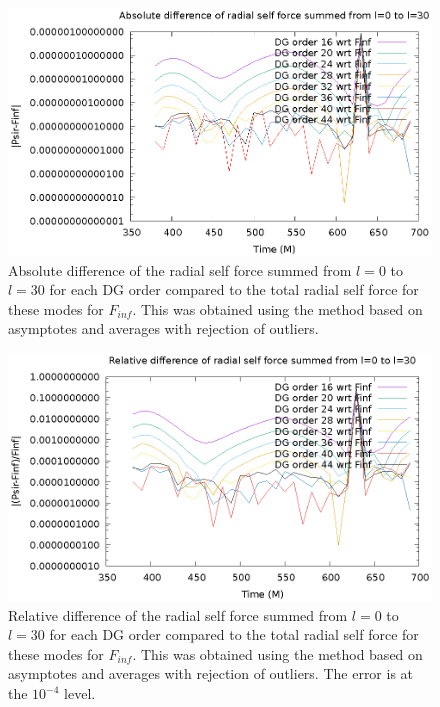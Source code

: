 \begin{figure}
\includegraphics{absdiffpsirvtwfinfdgorders}
\caption{Absolute difference of the radial self force summed from $l=0$ to $l=30$  for each DG order compared to the total radial self force for these modes for $F_{inf}$. This was obtained using the method based on asymptotes and averages with rejection of outliers.}
\label{absmixed}
\end{figure}

\begin{figure}
\includegraphics{reldiffpsirvtwfinfdgorders}
\caption{Relative difference of the radial self force summed from $l=0$ to $l=30$  for each DG order compared to the total radial self force for these modes for $F_{inf}$. This was obtained using the method based on asymptotes and averages with rejection of outliers. The error is at the $10^{-4}$ level.}
\label{relmixed}
\end{figure}
